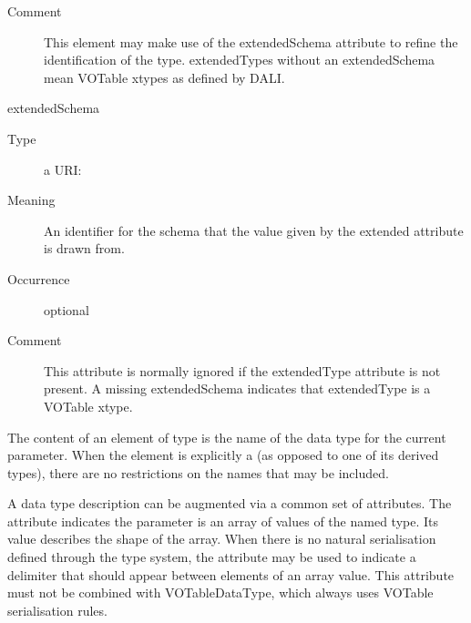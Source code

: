 \documentclass[11pt,a4paper]{ivoa}
\begin{document}
\begin{generated}
\begin{bigdescription}
\begin{description}
\item[Comment] 
                     This element may make use of the extendedSchema
                     attribute to refine the identification of the 
                     type.  extendedTypes without an extendedSchema 
                     mean VOTable xtypes as defined by DALI.
                  
\end{description}
\item[extendedSchema]
\begin{description}
\item[Type] a URI: 
\item[Meaning] 
                     An identifier for the schema that the value given
                     by the extended attribute is drawn from.
                  
\item[Occurrence] optional
\item[Comment] 
                     This attribute is normally ignored if the
                     extendedType attribute is not present.  A missing
                     extendedSchema indicates that extendedType is a
                     VOTable xtype.
                  
\end{description}


\end{bigdescription}\endgroup

\endgroup
\end{generated}


The content of an element of type  is the name
of the data type for the current parameter.  When the element is explicitly
a  (as opposed to one of its derived types),
there are no restrictions on the names that may be included.  



A data type description can be augmented via a common set of
 attributes.  The
 attribute indicates the parameter is an array
of values of the named type.  Its value describes the shape of the
array. When there is no natural serialisation defined through the type
system, the  attribute may be used to indicate
a delimiter that should appear between elements of an array value.  This
attribute must not be combined with VOTableDataType, which always
uses VOTable serialisation rules.
\end{document}
